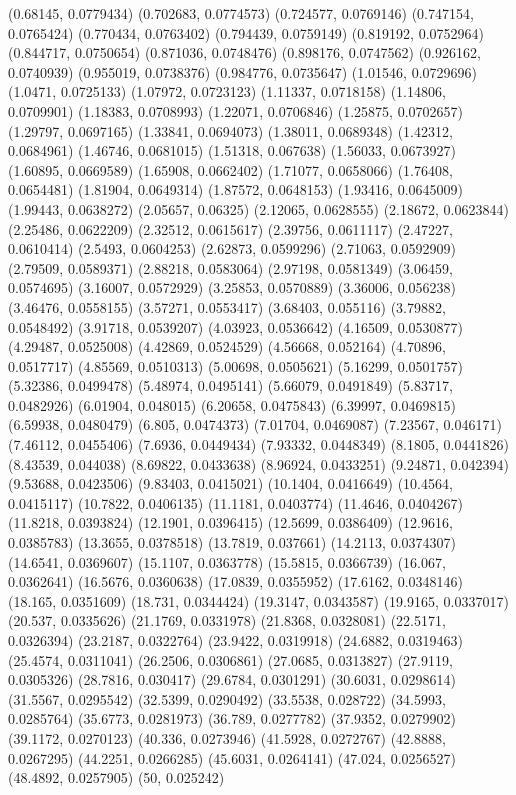 {(0.68145, 0.0779434)
(0.702683, 0.0774573)
(0.724577, 0.0769146)
(0.747154, 0.0765424)
(0.770434, 0.0763402)
(0.794439, 0.0759149)
(0.819192, 0.0752964)
(0.844717, 0.0750654)
(0.871036, 0.0748476)
(0.898176, 0.0747562)
(0.926162, 0.0740939)
(0.955019, 0.0738376)
(0.984776, 0.0735647)
(1.01546, 0.0729696)
(1.0471, 0.0725133)
(1.07972, 0.0723123)
(1.11337, 0.0718158)
(1.14806, 0.0709901)
(1.18383, 0.0708993)
(1.22071, 0.0706846)
(1.25875, 0.0702657)
(1.29797, 0.0697165)
(1.33841, 0.0694073)
(1.38011, 0.0689348)
(1.42312, 0.0684961)
(1.46746, 0.0681015)
(1.51318, 0.067638)
(1.56033, 0.0673927)
(1.60895, 0.0669589)
(1.65908, 0.0662402)
(1.71077, 0.0658066)
(1.76408, 0.0654481)
(1.81904, 0.0649314)
(1.87572, 0.0648153)
(1.93416, 0.0645009)
(1.99443, 0.0638272)
(2.05657, 0.06325)
(2.12065, 0.0628555)
(2.18672, 0.0623844)
(2.25486, 0.0622209)
(2.32512, 0.0615617)
(2.39756, 0.0611117)
(2.47227, 0.0610414)
(2.5493, 0.0604253)
(2.62873, 0.0599296)
(2.71063, 0.0592909)
(2.79509, 0.0589371)
(2.88218, 0.0583064)
(2.97198, 0.0581349)
(3.06459, 0.0574695)
(3.16007, 0.0572929)
(3.25853, 0.0570889)
(3.36006, 0.056238)
(3.46476, 0.0558155)
(3.57271, 0.0553417)
(3.68403, 0.055116)
(3.79882, 0.0548492)
(3.91718, 0.0539207)
(4.03923, 0.0536642)
(4.16509, 0.0530877)
(4.29487, 0.0525008)
(4.42869, 0.0524529)
(4.56668, 0.052164)
(4.70896, 0.0517717)
(4.85569, 0.0510313)
(5.00698, 0.0505621)
(5.16299, 0.0501757)
(5.32386, 0.0499478)
(5.48974, 0.0495141)
(5.66079, 0.0491849)
(5.83717, 0.0482926)
(6.01904, 0.048015)
(6.20658, 0.0475843)
(6.39997, 0.0469815)
(6.59938, 0.0480479)
(6.805, 0.0474373)
(7.01704, 0.0469087)
(7.23567, 0.046171)
(7.46112, 0.0455406)
(7.6936, 0.0449434)
(7.93332, 0.0448349)
(8.1805, 0.0441826)
(8.43539, 0.044038)
(8.69822, 0.0433638)
(8.96924, 0.0433251)
(9.24871, 0.042394)
(9.53688, 0.0423506)
(9.83403, 0.0415021)
(10.1404, 0.0416649)
(10.4564, 0.0415117)
(10.7822, 0.0406135)
(11.1181, 0.0403774)
(11.4646, 0.0404267)
(11.8218, 0.0393824)
(12.1901, 0.0396415)
(12.5699, 0.0386409)
(12.9616, 0.0385783)
(13.3655, 0.0378518)
(13.7819, 0.037661)
(14.2113, 0.0374307)
(14.6541, 0.0369607)
(15.1107, 0.0363778)
(15.5815, 0.0366739)
(16.067, 0.0362641)
(16.5676, 0.0360638)
(17.0839, 0.0355952)
(17.6162, 0.0348146)
(18.165, 0.0351609)
(18.731, 0.0344424)
(19.3147, 0.0343587)
(19.9165, 0.0337017)
(20.537, 0.0335626)
(21.1769, 0.0331978)
(21.8368, 0.0328081)
(22.5171, 0.0326394)
(23.2187, 0.0322764)
(23.9422, 0.0319918)
(24.6882, 0.0319463)
(25.4574, 0.0311041)
(26.2506, 0.0306861)
(27.0685, 0.0313827)
(27.9119, 0.0305326)
(28.7816, 0.030417)
(29.6784, 0.0301291)
(30.6031, 0.0298614)
(31.5567, 0.0295542)
(32.5399, 0.0290492)
(33.5538, 0.028722)
(34.5993, 0.0285764)
(35.6773, 0.0281973)
(36.789, 0.0277782)
(37.9352, 0.0279902)
(39.1172, 0.0270123)
(40.336, 0.0273946)
(41.5928, 0.0272767)
(42.8888, 0.0267295)
(44.2251, 0.0266285)
(45.6031, 0.0264141)
(47.024, 0.0256527)
(48.4892, 0.0257905)
(50, 0.025242)
}

